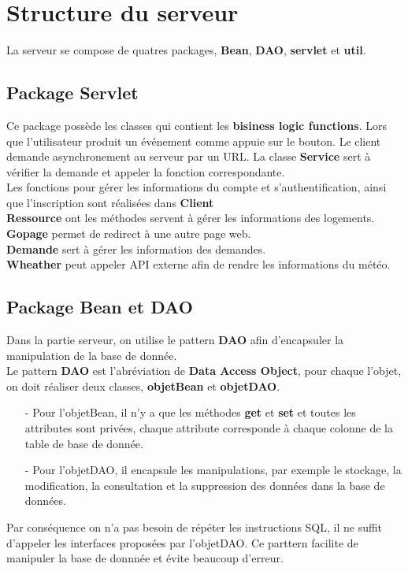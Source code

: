 \documentclass[14px]{article}
\begin{document}
\section{Structure du serveur}
La serveur se compose de quatres packages, \textbf{Bean}, \textbf{DAO}, \textbf{servlet} et \textbf{util}.

\subsection{Package Servlet}
Ce package possède les classes qui contient les \textbf{bisiness logic functions}. 
Lors que l'utilisateur produit un événement comme appuie sur le bouton. Le client demande asynchronement au serveur par un URL. La classe \textbf{Service} sert à vérifier la demande et appeler la fonction correspondante.\\
Les fonctions pour gérer les informations du compte et s'authentification, ainsi que l'inscription sont réalisées dans \textbf{Client}\\
\textbf{Ressource} ont les méthodes servent à gérer les informations des logements.\\
\textbf{Gopage} permet de redirect à une autre page web.\\
\textbf{Demande} sert à gérer les information des demandes.\\
\textbf{Wheather} peut appeler API externe afin de rendre les informations du météo.

\subsection{Package Bean et DAO}
Dans la partie serveur, on utilise le pattern \textbf{DAO} afin d'encapsuler la manipulation de la base de donnée. \\
Le pattern \textbf{DAO} est l'abréviation de \textbf{Data Access Object}, pour chaque l'objet, on doit réaliser deux classes, \textbf{objetBean} et \textbf{objetDAO}. 
\begin{enumerate}
	\item[-] Pour l'objetBean, il n'y a que les méthodes \textbf{get} et \textbf{set} et toutes les attributes sont privées, chaque attribute corresponde à chaque colonne de la table de base de donnée.
	\item[-] Pour l'objetDAO, il encapsule les manipulations, par exemple le stockage, la modification, la consultation et la suppression des données dans la base de données.
\end{enumerate}
Par conséquence on n'a pas besoin de répéter les instructions SQL, il ne suffit d'appeler les interfaces proposées par l'objetDAO. Ce parttern facilite de manipuler la base de donnnée et évite beaucoup d'erreur. 
\end{document}

